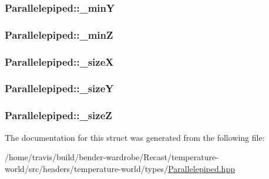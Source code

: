 \hypertarget{struct_parallelepiped_a5771e43afdf839db265e15405cb2cf06}{
\subsubsection[{\-\_\-min\-Y}]{ Parallelepiped\-::\-\_\-min\-Y\hspace{0.3cm}{\ttfamily [protected]}}}\label{struct_parallelepiped_a5771e43afdf839db265e15405cb2cf06}
\hypertarget{struct_parallelepiped_a236bbf5d0a7354f2f8c11566a9552631}{
\subsubsection[{\-\_\-min\-Z}]{ Parallelepiped\-::\-\_\-min\-Z\hspace{0.3cm}{\ttfamily [protected]}}}\label{struct_parallelepiped_a236bbf5d0a7354f2f8c11566a9552631}
\hypertarget{struct_parallelepiped_abff135261e4f3e6e8ea9c6dd185de0cd}{
\subsubsection[{\-\_\-size\-X}]{ Parallelepiped\-::\-\_\-size\-X\hspace{0.3cm}{\ttfamily [protected]}}}\label{struct_parallelepiped_abff135261e4f3e6e8ea9c6dd185de0cd}
\hypertarget{struct_parallelepiped_a722af4ec16bb4ede57cb73a527d16dbf}{
\subsubsection[{\-\_\-size\-Y}]{ Parallelepiped\-::\-\_\-size\-Y\hspace{0.3cm}{\ttfamily [protected]}}}\label{struct_parallelepiped_a722af4ec16bb4ede57cb73a527d16dbf}
\hypertarget{struct_parallelepiped_a99b032966bf653c13ca8d9645ad14b5e}{
\subsubsection[{\-\_\-size\-Z}]{ Parallelepiped\-::\-\_\-size\-Z\hspace{0.3cm}{\ttfamily [protected]}}}\label{struct_parallelepiped_a99b032966bf653c13ca8d9645ad14b5e}


The documentation for this struct was generated from the following file\-:\begin{DoxyCompactItemize}
\item 
/home/travis/build/bender-\/wardrobe/\-Recast/temperature-\/world/src/headers/temperature-\/world/types/\hyperlink{_parallelepiped_8hpp}{Parallelepiped.\-hpp}\end{DoxyCompactItemize}
